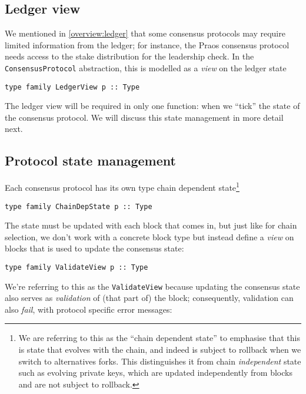 \subsection{Ledger view}
\label{consensus:class:ledgerview}

We mentioned in \cref{overview:ledger} that some consensus protocols may require
limited information from the ledger; for instance, the Praos consensus protocol
needs access to the stake distribution for the leadership check. In the
\lstinline!ConsensusProtocol! abstraction, this is modelled as a \emph{view}
on the ledger state

\begin{lstlisting}
type family LedgerView p :: Type
\end{lstlisting}

The ledger view will be required in only one function: when we ``tick'' the
state of the consensus protocol. We will discuss this state management in more
detail next.

\subsection{Protocol state management}
\label{consensus:class:state}

Each consensus protocol has its own type chain dependent state\footnote{We are
referring to this as the ``chain dependent state'' to emphasise that this is
state that evolves with the chain, and indeed is subject to rollback when we
switch to alternatives forks. This distinguishes it from chain
\emph{independent} state such as evolving private keys, which are updated
independently from blocks and are not subject to rollback.}

\begin{lstlisting}
type family ChainDepState p :: Type
\end{lstlisting}

The state must be updated with each block that comes in, but just like for
chain selection, we don't work with a concrete block type but instead define a
\emph{view} on blocks that is used to update the consensus state:

\begin{lstlisting}
type family ValidateView p :: Type
\end{lstlisting}

We're referring to this as the \lstinline!ValidateView! because updating the
consensus state also serves as \emph{validation} of (that part of) the block;
consequently, validation can also \emph{fail}, with protocol specific error
messages:

